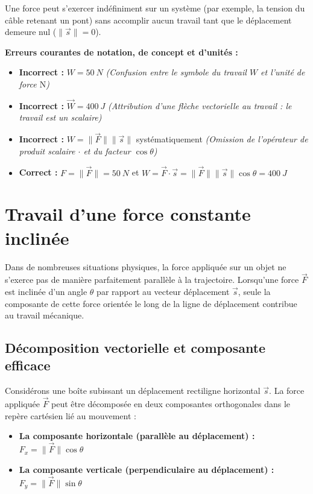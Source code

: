 \documentclass[11pt,openany]{book}
\begin{document}
Une force peut s'exercer indéfiniment sur un système (par exemple, la tension du câble retenant un pont) sans accomplir aucun travail tant que le déplacement demeure nul ($\|\vec{s}\| = 0$).

\begin{erreur}
\textbf{Erreurs courantes de notation, de concept et d'unités :}

\begin{itemize}
    \item \textbf{Incorrect :} $W = \SI{50}{N}$ \quad \textit{(Confusion entre le symbole du travail $W$ et l'unité de force $\mathrm{N}$)}
    \item \textbf{Incorrect :} $\vec{W} = \SI{400}{J}$ \quad \textit{(Attribution d'une flèche vectorielle au travail : le travail est un scalaire)}
    \item \textbf{Incorrect :} $W = \|\vec{F}\| \|\vec{s}\|$ systématiquement \quad \textit{(Omission de l'opérateur de produit scalaire $\cdot$ et du facteur $\cos\theta$)}
    \item \textbf{Correct :} $F = \|\vec{F}\| = \SI{50}{N}$ et $W = \vec{F} \cdot \vec{s} = \|\vec{F}\| \|\vec{s}\| \cos\theta = \SI{400}{J}$
\end{itemize}
\end{erreur}
\section{Travail d'une force constante inclinée}

Dans de nombreuses situations physiques, la force appliquée sur un objet ne s'exerce pas de manière parfaitement parallèle à la trajectoire. Lorsqu'une force $\vec{F}$ est inclinée d'un angle $\theta$ par rapport au vecteur déplacement $\vec{s}$, seule la composante de cette force orientée le long de la ligne de déplacement contribue au travail mécanique.

\subsection*{Décomposition vectorielle et composante efficace}

Considérons une boîte subissant un déplacement rectiligne horizontal $\vec{s}$. La force appliquée $\vec{F}$ peut être décomposée en deux composantes orthogonales dans le repère cartésien lié au mouvement :

\begin{itemize}
    \item \textbf{La composante horizontale (parallèle au déplacement) :} $F_x = \|\vec{F}\| \cos\theta$
    \item \textbf{La composante verticale (perpendiculaire au déplacement) :} $F_y = \|\vec{F}\| \sin\theta$
\end{itemize}
\end{document}
